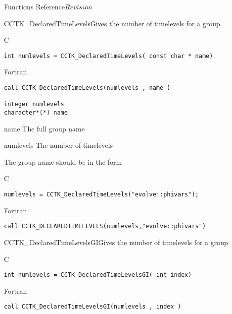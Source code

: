 \begin{cactuspart}{ Functions Reference}{}{$Revision$}


\begin{FunctionDescription}{CCTK\_DeclaredTimeLevels}{Gives the number of timelevels for a group}
\label{CCTK-DeclaredTimeLevels}
\begin{SynopsisSection}
\begin{Synopsis}{C}
\begin{verbatim}int numlevels = CCTK_DeclaredTimeLevels( const char * name)\end{verbatim}
\end{Synopsis}
\begin{Synopsis}{Fortran}
\begin{verbatim}call CCTK_DeclaredTimeLevels(numlevels , name )

integer numlevels
character*(*) name\end{verbatim}
\end{Synopsis}
\end{SynopsisSection}
\begin{ParameterSection}
\begin{Parameter}{name}
The full group name
\end{Parameter}
\begin{Parameter}{numlevels}
The number of timelevels
\end{Parameter}
\end{ParameterSection}
\begin{Discussion}
The group name should be in the form 
\end{Discussion}
\begin{ExampleSection}
\begin{Example}{C}
\begin{verbatim}
numlevels = CCTK_DeclaredTimeLevels("evolve::phivars");
\end{verbatim}
\end{Example}
\begin{Example}{Fortran}
\begin{verbatim}
call CCTK_DECLAREDTIMELEVELS(numlevels,"evolve::phivars")
\end{verbatim}
\end{Example}
\end{ExampleSection}
\end{FunctionDescription}

\begin{FunctionDescription}{CCTK\_DeclaredTimeLevelsGI}{Gives the number of timelevels for a group}
\label{CCTK-DeclaredTimeLevelsGI}
\begin{SynopsisSection}
\begin{Synopsis}{C}
\begin{verbatim}int numlevels = CCTK_DeclaredTimeLevelsGI( int index)\end{verbatim}
\end{Synopsis}
\begin{Synopsis}{Fortran}
\begin{verbatim}call CCTK_DeclaredTimeLevelsGI(numlevels , index )


\end{verbatim}
\end{Synopsis}
\end{SynopsisSection}
\end{FunctionDescription}
\end{cactuspart}
